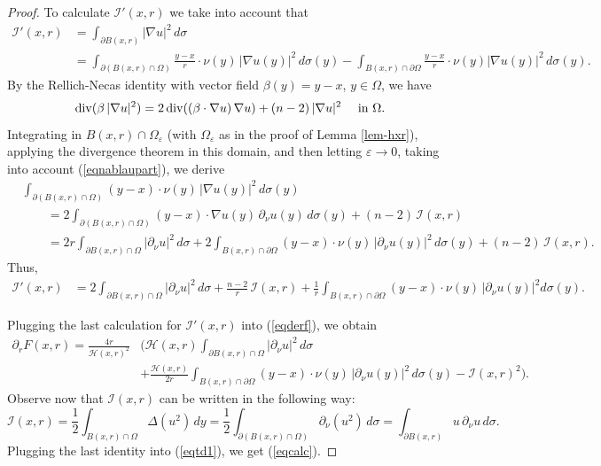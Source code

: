 \documentclass[11pt]{amsart}
\newcommand{\HH}{{\mathcal H}}
\newcommand{\II}{{\mathcal I}}
\newcommand{\rf}[1]{{(\ref{#1})}}
\newcommand{\ve}{{\varepsilon}}
\theoremstyle{definition}
\theoremstyle{remark}
\numberwithin{equation}{section}
\begin{document}
\begin{proof}
To calculate $\II'(x,r)$ we take into account that
\begin{align*}
\II'(x,r) & = \int_{\partial B(x,r)} |\nabla u|^2\,d\sigma\\
& = \int_{\partial (B(x,r)\cap \Omega)} \frac{y-x}r\cdot\nu(y)\,
|\nabla u(y)|^2\,d\sigma (y)- \int_{B(x,r)\cap \partial\Omega} \frac{y-x}r\cdot\nu(y)|\nabla u(y)|^2\,d\sigma(y).
\end{align*}
 By the Rellich-Necas identity with vector field $\beta(y) = y-x$, $y\in\Omega$, we have
$${\rm div}(\beta\,|\nabla u|^2)= 2\,{\rm div}((\beta\cdot\nabla u)\,\nabla u) + (n-2)\,|\nabla u|^2
\quad \mbox{ in $\Omega.$}
$$
Integrating in $B(x,r)\cap\Omega_\ve$ (with $\Omega_\ve$ as in the proof of Lemma \ref{lem-hxr}),
applying the divergence theorem in this domain, and then letting $\ve\to0$, taking into account \rf{eqnablaupart}, we derive
\begin{align*}
&\int_{\partial(B(x,r)\cap\Omega)} (y-x)\cdot\nu(y)\,|\nabla u(y)|^2\,d\sigma(y)\\
& \qquad=
2\int_{\partial(B(x,r)\cap\Omega)} (y-x)\cdot\nabla u(y)\,\partial_\nu u(y) \,d\sigma(y)+ (n-2)\,\II(x,r)\\
&\qquad = 2r\int_{\partial B(x,r)\cap\Omega} |\partial_\nu u|^2\,d\sigma 
+2\int_{B(x,r)\cap\partial\Omega} (y-x)\cdot\nu(y)\,|\partial_\nu u(y)|^2\,d\sigma(y)
+ (n-2)\,\II(x,r).
\end{align*}
Thus,
\begin{align*}
\II'(x,r) & 
 =2\! \int_{\partial B(x,r)\cap\Omega} \big|\partial_\nu u\big|^2\,d\sigma + \frac{n-2}r\,\II(x,r) + \frac1r \int_{B(x,r)\cap\partial\Omega} (y-x)\cdot \nu(y)\,\big|\partial_\nu u(y)\big|^2d\sigma(y).
\end{align*}

Plugging the last calculation for $\II'(x,r)$ into \rf{eqderf}, we obtain
\begin{align}\label{eqtd1}
\partial_r F(x,r)  =  
\frac{4r}{\HH(x,r)^2} &\bigg(
\HH(x,r) 
 \int_{\partial B(x,r)\cap\Omega} \big|\partial_\nu u\big|^2\,d\sigma \\
& +  \frac{\HH(x,r)}{2r} \int_{B(x,r)\cap\partial\Omega} (y-x)\cdot \nu(y)\,\big|\partial_\nu u(y)\big|^2\,d\sigma(y)
-  \II(x,r)^2\bigg).\nonumber
\end{align}
Observe now that $\II(x,r)$ can be written in the following way:
$$\II(x,r) = \frac12\int_{B(x,r)\cap\Omega} \Delta(u^2)\,dy = \frac12\int_{\partial (B(x,r)\cap\Omega)} \partial_\nu(u^2)\,d\sigma = \int_{\partial B(x,r)} u\,\partial_\nu u\,d\sigma.$$
Plugging the last identity into \rf{eqtd1}, we get \rf{eqcalc}.


\end{proof}
\end{document}
